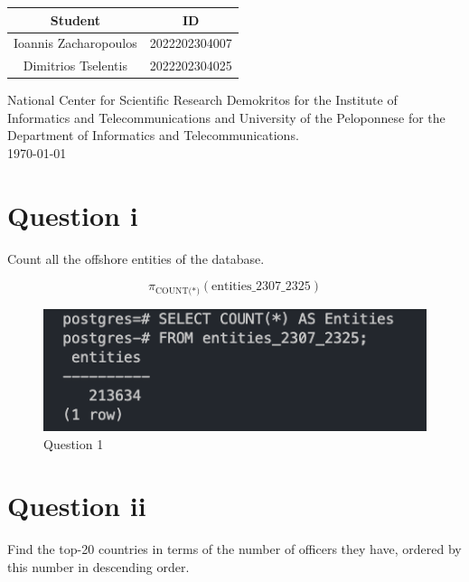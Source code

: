 \documentclass{article}
\begin{document}
\begin{titlepage}
\begin{center}
        \vspace{1cm}
        \renewcommand{\arraystretch}{1.5}
        \begin{tabular}{|c|c|}
            \hline
            \textbf{Student}              & \textbf{ID}           \\
            \hline
            \large{Ioannis Zacharopoulos} & \large{2022202304007} \\
            \hline
            \large{Dimitrios Tselentis}   & \large{2022202304025} \\
            \hline
        \end{tabular}

        \vspace{2cm}
        \Large
        \textmd{National Center for Scientific Research Demokritos for the Institute of Informatics and Telecommunications and University of the Peloponnese for the Department of Informatics and Telecommunications.} \\[0.81cm]

        \today \\

    \end{center}
\end{titlepage}

\newpage
\onehalfspacing

\section*{Question i}
Count all the offshore entities of the database.


\[ \pi_{\text{{COUNT(*)}}}(\text{{entities\_2307\_2325}}) \]


\begin{figure}[h]
    \centering
    \includegraphics[width=0.6\linewidth]{Q1.png}
    \captionsetup{labelformat=empty}
    \caption{Question 1}
\end{figure}



\newpage

\section*{Question ii}
Find the top-20 countries in terms of the number of officers they have, ordered by this number in descending order.
\end{document}
